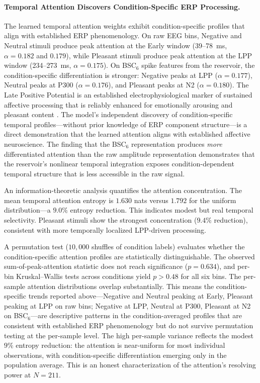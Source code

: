 \paragraph{Temporal Attention Discovers Condition-Specific ERP Processing.} The learned temporal attention weights exhibit condition-specific profiles that align with established ERP phenomenology. On raw EEG bins, Negative and Neutral stimuli produce peak attention at the Early window (39--78~ms, $\alpha = 0.182$ and $0.179$), while Pleasant stimuli produce peak attention at the LPP window (234--273~ms, $\alpha = 0.175$). On BSC$_6$ spike features from the reservoir, the condition-specific differentiation is stronger: Negative peaks at LPP ($\alpha = 0.177$), Neutral peaks at P300 ($\alpha = 0.176$), and Pleasant peaks at N2 ($\alpha = 0.180$). The Late Positive Potential is an established electrophysiological marker of sustained affective processing that is reliably enhanced for emotionally arousing and pleasant content \cite{nelson_hajcak_2017}. The model's independent discovery of condition-specific temporal profiles---without prior knowledge of ERP component structure---is a direct demonstration that the learned attention aligns with established affective neuroscience. The finding that the BSC$_6$ representation produces \emph{more} differentiated attention than the raw amplitude representation demonstrates that the reservoir's nonlinear temporal integration exposes condition-dependent temporal structure that is less accessible in the raw signal.

An information-theoretic analysis quantifies the attention concentration. The mean temporal attention entropy is $1.630$ nats versus $1.792$ for the uniform distribution---a $9.0\%$ entropy reduction. This indicates modest but real temporal selectivity. Pleasant stimuli show the strongest concentration ($9.4\%$ reduction), consistent with more temporally localized LPP-driven processing.

A permutation test ($10{,}000$ shuffles of condition labels) evaluates whether the condition-specific attention profiles are statistically distinguishable. The observed sum-of-peak-attention statistic does not reach significance ($p = 0.634$), and per-bin Kruskal--Wallis tests across conditions yield $p > 0.48$ for all six bins. The per-sample attention distributions overlap substantially. This means the condition-specific trends reported above---Negative and Neutral peaking at Early, Pleasant peaking at LPP on raw bins; Negative at LPP, Neutral at P300, Pleasant at N2 on BSC$_6$---are descriptive patterns in the condition-averaged profiles that are consistent with established ERP phenomenology but do not survive permutation testing at the per-sample level. The high per-sample variance reflects the modest $9\%$ entropy reduction: the attention is near-uniform for most individual observations, with condition-specific differentiation emerging only in the population average. This is an honest characterization of the attention's resolving power at $N = 211$.

